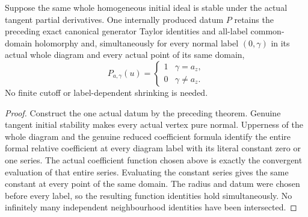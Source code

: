 \begin{theorem}
\label{hir:actual-uniform-canonical-diagram-function-identities}
\leanok
Suppose the same whole homogeneous initial ideal is stable under the
actual tangent partial derivatives. One internally produced datum $P$
retains the preceding exact canonical generator Taylor identities and
all-label common-domain holomorphy and, simultaneously for every normal
label $(0,\gamma)$ in its actual whole diagram and every actual point
of its same domain,
\[
 P_{a,\gamma}(u)=
 \begin{cases}1&\gamma=a_z,\\0&\gamma\ne a_z.\end{cases}
\]
No finite cutoff or label-dependent shrinking is needed.
\end{theorem}
\begin{proof}
Construct the one actual datum by the preceding theorem. Genuine tangent
initial stability makes every actual vertex pure normal. Upperness of
the whole diagram and the genuine reduced coefficient formula identify
the entire formal relative coefficient at every diagram label with its
literal constant zero or one series. The actual coefficient function
chosen above is exactly the convergent evaluation of that entire series.
Evaluating the constant series gives the same constant at every point
of the same domain. The radius and datum were chosen before every label,
so the resulting function identities hold simultaneously. No infinitely
many independent neighbourhood identities have been intersected.
\end{proof}

